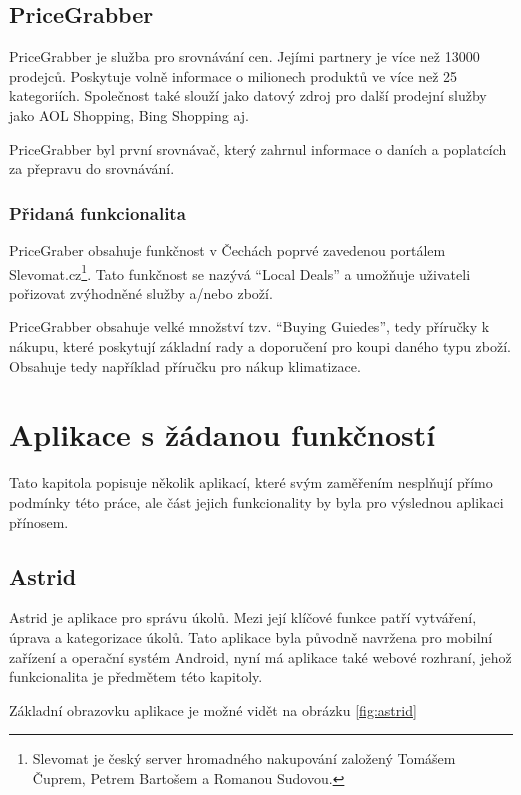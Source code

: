 \subsection{PriceGrabber}
PriceGrabber je služba pro srovnávání cen. Jejími partnery je více než 13000 prodejců. Poskytuje volně informace o milionech produktů ve více než 25 kategoriích. Společnost také slouží jako datový zdroj pro další prodejní služby jako AOL Shopping, Bing Shopping aj. \cite{website:wiki:pricegrabber}

PriceGrabber byl první srovnávač, který zahrnul informace o daních a poplatcích za přepravu do srovnávání. \cite{website:wiki:pricegrabber}

\subsubsection{Přidaná funkcionalita}
PriceGraber obsahuje funkčnost v Čechách poprvé zavedenou portálem Slevomat.cz\footnote{Slevomat je český server hromadného nakupování založený Tomášem Čuprem, Petrem Bartošem a Romanou Sudovou.}. Tato funkčnost se nazývá ``Local Deals'' a umožňuje uživateli pořizovat zvýhodněné služby a/nebo zboží.

PriceGrabber obsahuje velké množství tzv. ``Buying Guiedes'', tedy příručky k nákupu, které poskytují základní rady a doporučení pro koupi daného typu zboží. Obsahuje tedy například příručku pro nákup klimatizace.

\section{Aplikace s žádanou funkčností}
\label{sec:aplikace-s-zadanou-funkcnosti}
Tato kapitola popisuje několik aplikací, které svým zaměřením nesplňují přímo podmínky této práce, ale část jejich funkcionality by byla pro výslednou aplikaci přínosem.

\subsection{Astrid}
\label{sec:astrid}
Astrid je aplikace pro správu úkolů. Mezi její klíčové funkce patří vytváření, úprava a kategorizace úkolů. Tato aplikace byla původně navržena pro mobilní zařízení a operační systém Android, nyní má aplikace také webové rozhraní, jehož funkcionalita je předmětem této kapitoly.

Základní obrazovku aplikace je možné vidět na obrázku \ref{fig:astrid}

